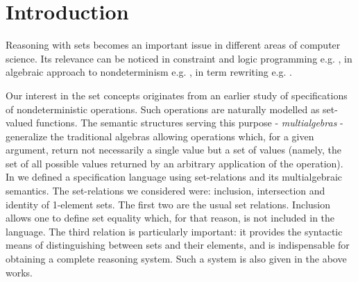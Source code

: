 \maketitle


\section{Introduction}

Reasoning with sets becomes an important issue in different areas of
computer science. Its relevance can be noticed in constraint and logic 
programming e.g. \cite{SD,DO,Jay,Sto}, in algebraic approach to nondeterminism
e.g. \cite{HusB,PS1,MW}, in term rewriting e.g. \cite{LA,Kap,HusB}.

Our interest in the set concepts originates from an earlier study of 
specifications of nondeterministic operations. Such operations
are naturally modelled as set-valued functions. The semantic structures
serving this purpose - {\em multialgebras} - generalize the traditional 
algebras allowing operations which, for a given argument, return not 
necessarily a single value but a set of values (namely, the set of all 
possible values returned by an arbitrary application of the operation).
In \cite{MW,Mich} we defined a specification language using set-relations 
and its multialgebraic semantics. The set-relations we considered
were: inclusion, intersection and identity of 1-element sets. The first two
are the usual set relations. Inclusion allows one to define set equality
which, for that reason, is not included in the language. The third relation is 
particularly important: it provides the syntactic means of distinguishing 
between sets and their elements, and is indispensable for obtaining a 
complete reasoning system. Such a system is also given in the above works.

